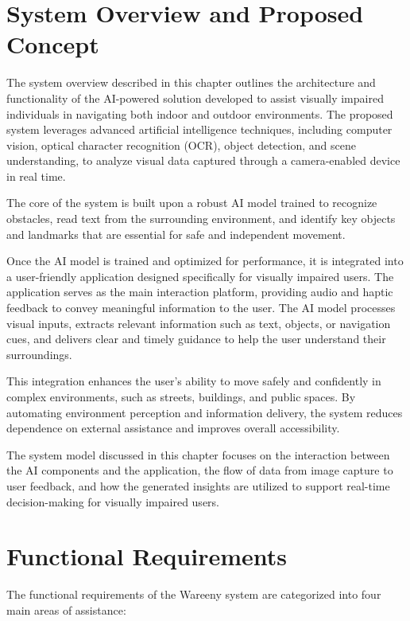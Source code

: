 \documentclass[a4paper]{report}
\begin{document}
\section{System Overview and Proposed Concept}
\label{sec:system-overview}

The system overview described in this chapter outlines the architecture and functionality of the AI-powered solution developed to assist visually impaired individuals in navigating both indoor and outdoor environments. The proposed system leverages advanced artificial intelligence techniques, including computer vision, optical character recognition (OCR), object detection, and scene understanding, to analyze visual data captured through a camera-enabled device in real time.

The core of the system is built upon a robust AI model trained to recognize obstacles, read text from the surrounding environment, and identify key objects and landmarks that are essential for safe and independent movement.

Once the AI model is trained and optimized for performance, it is integrated into a user-friendly application designed specifically for visually impaired users. The application serves as the main interaction platform, providing audio and haptic feedback to convey meaningful information to the user. The AI model processes visual inputs, extracts relevant information such as text, objects, or navigation cues, and delivers clear and timely guidance to help the user understand their surroundings.

This integration enhances the user's ability to move safely and confidently in complex environments, such as streets, buildings, and public spaces. By automating environment perception and information delivery, the system reduces dependence on external assistance and improves overall accessibility.

The system model discussed in this chapter focuses on the interaction between the AI components and the application, the flow of data from image capture to user feedback, and how the generated insights are utilized to support real-time decision-making for visually impaired users.

\section{Functional Requirements}
\label{sec:functional-req}

The functional requirements of the Wareeny system are categorized into four main areas of assistance:
\end{document}
